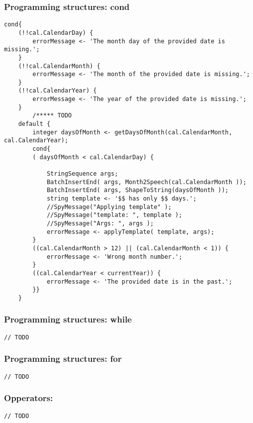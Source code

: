 \documentclass[11pt]{beamer}
\begin{document}
\begin{frame}[fragile]
\frametitle{Programming structures: cond}
\begin{lstlisting}[language=lekta]
cond{
    (!!cal.CalendarDay) {
        errorMessage <- 'The month day of the provided date is missing.';
    }
    (!!cal.CalendarMonth) {
        errorMessage <- 'The month of the provided date is missing.';
    }
    (!!cal.CalendarYear) {
        errorMessage <- 'The year of the provided date is missing.';
    }
    	/***** TODO
    default {
        integer daysOfMonth <- getDaysOfMonth(cal.CalendarMonth, cal.CalendarYear);
        cond{
        ( daysOfMonth < cal.CalendarDay) {

            StringSequence args;
            BatchInsertEnd( args, Month2Speech(cal.CalendarMonth ));
            BatchInsertEnd( args, ShapeToString(daysOfMonth ));
            string template <- '$$ has only $$ days.';
            //SpyMessage("Applying template" );
            //SpyMessage("template: ", template );
            //SpyMessage("Args: ", args );
            errorMessage <- applyTemplate( template, args);
        }
        ((cal.CalendarMonth > 12) || (cal.CalendarMonth < 1)) {
            errorMessage <- 'Wrong month number.';
        }
        ((cal.CalendarYear < currentYear)) {
            errorMessage <- 'The provided date is in the past.';
        }}
    }
\end{lstlisting}
\end{frame}

\begin{frame}[fragile]
\frametitle{Programming structures: while}
\begin{lstlisting}[language=lekta]
// TODO
\end{lstlisting}
\end{frame}

\begin{frame}[fragile]
\frametitle{Programming structures: for}
\begin{lstlisting}[language=lekta]
// TODO
\end{lstlisting}
\end{frame}

\begin{frame}[fragile]
\frametitle{Opperators:}
\begin{lstlisting}[language=lekta]
// TODO
\end{lstlisting}
\end{frame}

\begin{frame}
\end{frame}
\end{document}
